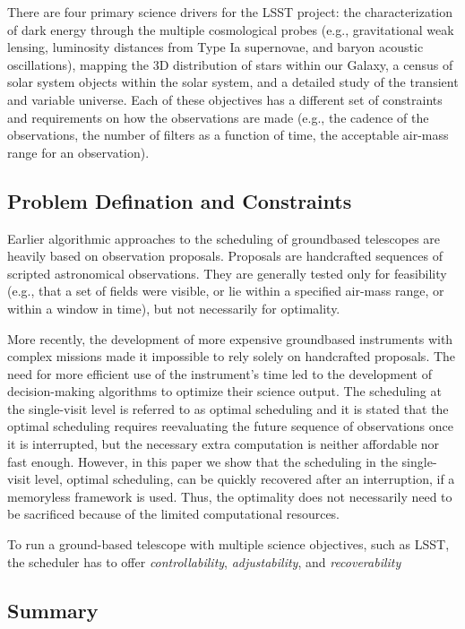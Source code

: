 \documentclass{article}
\begin{document}
There are four primary science drivers for the LSST project:
the characterization of dark energy through the multiple
cosmological probes (e.g., gravitational weak lensing, luminosity distances from Type Ia supernovae, and baryon acoustic
oscillations), mapping the 3D distribution of stars within our
Galaxy, a census of solar system objects within the solar
system, and a detailed study of the transient and variable
universe. Each of these objectives has a different set of
constraints and requirements on how the observations are made
(e.g., the cadence of the observations, the number of filters as a
function of time, the acceptable air-mass range for an
observation). 

\subsection*{Problem Defination and Constraints}


Earlier algorithmic approaches to the scheduling of groundbased telescopes 
are heavily based on observation proposals.
Proposals are handcrafted sequences of scripted astronomical
observations. They are generally tested only for feasibility
(e.g., that a set of fields were visible, or lie within a specified
air-mass range, or within a window in time), but not necessarily
for optimality.

More recently, the development of more expensive groundbased instruments with complex missions made it impossible to
rely solely on handcrafted proposals. The need for more
efficient use of the instrument’s time led to the development of decision-making algorithms to optimize their science output.
The scheduling at the single-visit level is referred to as optimal scheduling and it is
stated that the optimal scheduling requires reevaluating the
future sequence of observations once it is interrupted, but the
necessary extra computation is neither affordable nor fast
enough. However, in this paper we show that the scheduling in
the single-visit level, optimal scheduling, can be quickly
recovered after an interruption, if a memoryless framework is
used. Thus, the optimality does not necessarily need to be
sacrificed because of the limited computational resources.

To run a ground-based telescope with multiple science
objectives, such as LSST, the scheduler has to offer
\textit{controllability}, \textit{adjustability}, and \textit{recoverability}

\subsection*{Summary}
\end{document}
